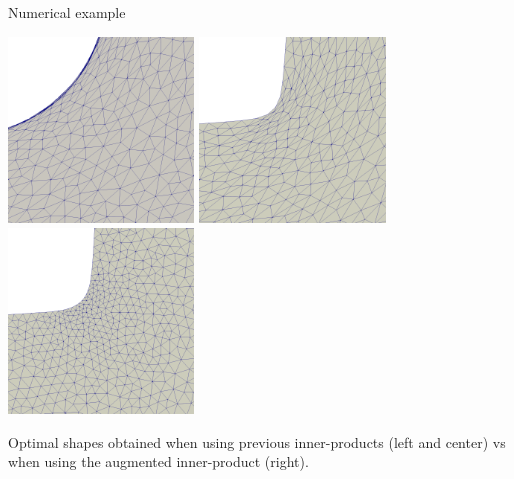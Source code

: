 \documentclass[aspectratio=1610]{beamer}
\begin{document}
\begin{frame}{Numerical example}
    \begin{adjustwidth}{-3em}{-3em}
        \begin{center}
            \includegraphics[width=0.37\textwidth]{./img/levelset/grad_mesh_zoom.png}
            \hspace{0.1cm}
            \includegraphics[width=0.37\textwidth]{./img/levelset/sym_grad_mesh_zoom.png}
            \hspace{0.1cm}
            \includegraphics[width=0.37\textwidth]{./img/levelset/CR_sym_grad_1e-2_mesh_zoom.png}\\
        \end{center}
    \end{adjustwidth}
    \begin{center}
        Optimal shapes obtained when using previous inner-products (left and center) vs when using the augmented inner-product (right).
    \end{center}
\end{frame}
\end{document}
